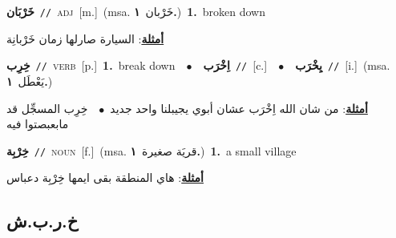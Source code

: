 \documentclass[10pt,a4paper,twoside]{article} %
\begin{document}
\begin{multicols}{2}
{\setlength\topsep{0pt}\textbf{\foreignlanguage{arabic}{خَرْبَان}}\ {\color{gray}\texttt{//}\color{black}}\ \textsc{adj}\ [m.]\ \color{gray}(msa. \foreignlanguage{arabic}{خَرْبان}~\foreignlanguage{arabic}{\textbf{١.}})\color{black}\ \textbf{1.}~broken down\  \begin{flushright}\color{gray}\foreignlanguage{arabic}{\textbf{\underline{\foreignlanguage{arabic}{أمثلة}}}: السيارة صارلها زمان خَرْبانِة}\end{flushright}\color{black}} \vspace{2mm}

{\setlength\topsep{0pt}\textbf{\foreignlanguage{arabic}{خِرِب}}\ {\color{gray}\texttt{//}\color{black}}\ \textsc{verb}\ [p.]\ \textbf{1.}~break down\ \ $\bullet$\ \ \setlength\topsep{0pt}\textbf{\foreignlanguage{arabic}{اِخْرَب}}\ {\color{gray}\texttt{//}\color{black}}\ [c.]\ \ $\bullet$\ \ \setlength\topsep{0pt}\textbf{\foreignlanguage{arabic}{يِخْرَب}}\ {\color{gray}\texttt{//}\color{black}}\ [i.]\ \color{gray}(msa. \foreignlanguage{arabic}{يَعْطَل}~\foreignlanguage{arabic}{\textbf{١.}})\color{black}\  \begin{flushright}\color{gray}\foreignlanguage{arabic}{\textbf{\underline{\foreignlanguage{arabic}{أمثلة}}}: من شان الله اِخْرَب عشان أبوي يجيبلنا واحد جديد\ $\bullet$\ \  خِرِب المسجِّل قد مابعبصتوا فيه}\end{flushright}\color{black}} \vspace{2mm}

{\setlength\topsep{0pt}\textbf{\foreignlanguage{arabic}{خِرْبِة}}\ {\color{gray}\texttt{//}\color{black}}\ \textsc{noun}\ [f.]\ \color{gray}(msa. \foreignlanguage{arabic}{قريَة صغيرة}~\foreignlanguage{arabic}{\textbf{١.}})\color{black}\ \textbf{1.}~a small village\  \begin{flushright}\color{gray}\foreignlanguage{arabic}{\textbf{\underline{\foreignlanguage{arabic}{أمثلة}}}: هاي المنطقة بقى ايمها خِرْبِة دعباس}\end{flushright}\color{black}} \vspace{2mm}

\vspace{-3mm}
\subsection*{\color{blue}\foreignlanguage{arabic}{خ.ر.ب.ش}\color{blue}{}} 


\end{multicols}
\end{document}
